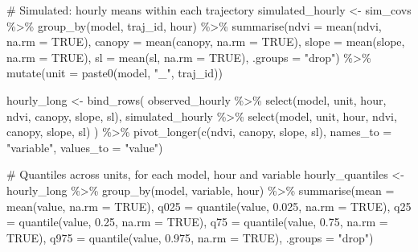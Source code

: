 \documentclass[
  letterpaper,
  DIV=11,
  numbers=noendperiod]{scrartcl}
\newenvironment{Shaded}{\begin{snugshade}}{\end{snugshade}}
\newcommand{\AttributeTok}[1]{\textcolor[rgb]{0.40,0.45,0.13}{#1}}
\newcommand{\CommentTok}[1]{\textcolor[rgb]{0.37,0.37,0.37}{#1}}
\newcommand{\ConstantTok}[1]{\textcolor[rgb]{0.56,0.35,0.01}{#1}}
\newcommand{\FloatTok}[1]{\textcolor[rgb]{0.68,0.00,0.00}{#1}}
\newcommand{\FunctionTok}[1]{\textcolor[rgb]{0.28,0.35,0.67}{#1}}
\newcommand{\NormalTok}[1]{\textcolor[rgb]{0.00,0.23,0.31}{#1}}
\newcommand{\OtherTok}[1]{\textcolor[rgb]{0.00,0.23,0.31}{#1}}
\newcommand{\SpecialCharTok}[1]{\textcolor[rgb]{0.37,0.37,0.37}{#1}}
\newcommand{\StringTok}[1]{\textcolor[rgb]{0.13,0.47,0.30}{#1}}
\begin{document}
\begin{Shaded}
\begin{Highlighting}[]
\CommentTok{\# Simulated: hourly means within each trajectory}
\NormalTok{simulated\_hourly }\OtherTok{\textless{}{-}}\NormalTok{ sim\_covs }\SpecialCharTok{\%\textgreater{}\%}
  \FunctionTok{group\_by}\NormalTok{(model, traj\_id, hour) }\SpecialCharTok{\%\textgreater{}\%}
  \FunctionTok{summarise}\NormalTok{(}\AttributeTok{ndvi =} \FunctionTok{mean}\NormalTok{(ndvi, }\AttributeTok{na.rm =} \ConstantTok{TRUE}\NormalTok{),}
            \AttributeTok{canopy =} \FunctionTok{mean}\NormalTok{(canopy, }\AttributeTok{na.rm =} \ConstantTok{TRUE}\NormalTok{),}
            \AttributeTok{slope =} \FunctionTok{mean}\NormalTok{(slope, }\AttributeTok{na.rm =} \ConstantTok{TRUE}\NormalTok{),}
            \AttributeTok{sl =} \FunctionTok{mean}\NormalTok{(sl, }\AttributeTok{na.rm =} \ConstantTok{TRUE}\NormalTok{),}
            \AttributeTok{.groups =} \StringTok{"drop"}\NormalTok{) }\SpecialCharTok{\%\textgreater{}\%}
  \FunctionTok{mutate}\NormalTok{(}\AttributeTok{unit =} \FunctionTok{paste0}\NormalTok{(model, }\StringTok{"\_"}\NormalTok{, traj\_id))}

\NormalTok{hourly\_long }\OtherTok{\textless{}{-}} \FunctionTok{bind\_rows}\NormalTok{(}
\NormalTok{  observed\_hourly }\SpecialCharTok{\%\textgreater{}\%} \FunctionTok{select}\NormalTok{(model, unit, hour, ndvi, canopy, slope, sl),}
\NormalTok{  simulated\_hourly }\SpecialCharTok{\%\textgreater{}\%} \FunctionTok{select}\NormalTok{(model, unit, hour, ndvi, canopy, slope, sl)}
\NormalTok{) }\SpecialCharTok{\%\textgreater{}\%}
  \FunctionTok{pivot\_longer}\NormalTok{(}\FunctionTok{c}\NormalTok{(ndvi, canopy, slope, sl),}
               \AttributeTok{names\_to =} \StringTok{"variable"}\NormalTok{, }\AttributeTok{values\_to =} \StringTok{"value"}\NormalTok{)}

\CommentTok{\# Quantiles across units, for each model, hour and variable}
\NormalTok{hourly\_quantiles }\OtherTok{\textless{}{-}}\NormalTok{ hourly\_long }\SpecialCharTok{\%\textgreater{}\%}
  \FunctionTok{group\_by}\NormalTok{(model, variable, hour) }\SpecialCharTok{\%\textgreater{}\%}
  \FunctionTok{summarise}\NormalTok{(}\AttributeTok{mean =} \FunctionTok{mean}\NormalTok{(value, }\AttributeTok{na.rm =} \ConstantTok{TRUE}\NormalTok{),}
            \AttributeTok{q025 =} \FunctionTok{quantile}\NormalTok{(value, }\FloatTok{0.025}\NormalTok{, }\AttributeTok{na.rm =} \ConstantTok{TRUE}\NormalTok{),}
            \AttributeTok{q25  =} \FunctionTok{quantile}\NormalTok{(value, }\FloatTok{0.25}\NormalTok{,  }\AttributeTok{na.rm =} \ConstantTok{TRUE}\NormalTok{),}
            \AttributeTok{q75  =} \FunctionTok{quantile}\NormalTok{(value, }\FloatTok{0.75}\NormalTok{,  }\AttributeTok{na.rm =} \ConstantTok{TRUE}\NormalTok{),}
            \AttributeTok{q975 =} \FunctionTok{quantile}\NormalTok{(value, }\FloatTok{0.975}\NormalTok{, }\AttributeTok{na.rm =} \ConstantTok{TRUE}\NormalTok{),}
            \AttributeTok{.groups =} \StringTok{"drop"}\NormalTok{)}
\end{Highlighting}
\end{Shaded}
\end{document}
